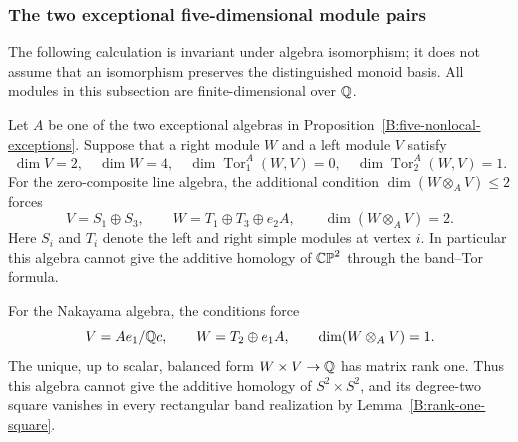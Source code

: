 \subsubsection{The two exceptional five-dimensional module pairs}

The following calculation is invariant under algebra isomorphism; it does
not assume that an isomorphism preserves the distinguished monoid basis.
All modules in this subsection are finite-dimensional over $\mathbb Q$.

\begin{lemma}\label{B:five-exceptional-targets}
Let $A$ be one of the two exceptional algebras in
Proposition~\ref{B:five-nonlocal-exceptions}.  Suppose that a right module $W$
and a left module $V$ satisfy
\[
 \dim V=2,\quad \dim W=4,\quad
 \dim\operatorname{Tor}_1^A(W,V)=0,\quad
 \dim\operatorname{Tor}_2^A(W,V)=1.
\]
For the zero-composite line algebra, the additional condition
$\dim(W\otimes_A V)\leq2$ forces
\[
 V=S_1\oplus S_3,\qquad
 W=T_1\oplus T_3\oplus e_2A,
 \qquad \dim(W\otimes_A V)=2.
\]
Here $S_i$ and $T_i$ denote the left and right simple modules at vertex
$i$.  In particular this algebra cannot give the additive homology of
$\mathbb {CP}^2$ through the band--Tor formula.

For the Nakayama algebra, the conditions force
\[
 V=Ae_1/\mathbb Q c,\qquad W=T_2\oplus e_1A,
 \qquad \dim(W\otimes_A V)=1.
\]
The unique, up to scalar, balanced form $W\times V\to\mathbb Q$ has matrix
rank one.  Thus this algebra cannot give the additive homology of
$S^2\times S^2$, and its degree-two square vanishes in every rectangular
band realization by Lemma~\ref{B:rank-one-square}.
\end{lemma}


